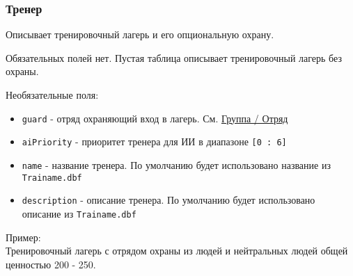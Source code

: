 \subsubsection{Тренер}
\label{trainer}
Описывает тренировочный лагерь и его опциональную охрану.

Обязательных полей нет. Пустая таблица описывает тренировочный лагерь без охраны.

Необязательные поля:
\begin{itemize}
\item \texttt{guard} - отряд охраняющий вход в лагерь. См. \hyperref[group]{Группа / Отряд}
\item \texttt{aiPriority} - приоритет тренера для ИИ в диапазоне \texttt{[0 : 6]}
\item \texttt{name} - название тренера. По умолчанию будет использовано название из \texttt{Trainame.dbf}
\item \texttt{description} - описание тренера. По умолчанию будет использовано описание из \texttt{Trainame.dbf}
\end{itemize}

Пример:\\
Тренировочный лагерь с отрядом охраны из людей и нейтральных людей общей ценностью 200 - 250.

\begin{figure}[H]

\end{figure}